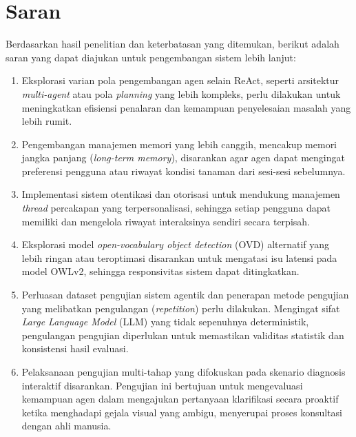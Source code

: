 \section{Saran}
Berdasarkan hasil penelitian dan keterbatasan yang ditemukan, berikut adalah saran yang dapat diajukan untuk pengembangan sistem lebih lanjut:

\begin{enumerate}[nosep]
    \item Eksplorasi varian pola pengembangan agen selain ReAct, seperti arsitektur \textit{multi-agent} atau pola \textit{planning} yang lebih kompleks, perlu dilakukan untuk meningkatkan efisiensi penalaran dan kemampuan penyelesaian masalah yang lebih rumit.
    \item Pengembangan manajemen memori yang lebih canggih, mencakup memori jangka panjang (\textit{long-term memory}), disarankan agar agen dapat mengingat preferensi pengguna atau riwayat kondisi tanaman dari sesi-sesi sebelumnya.
    \item Implementasi sistem otentikasi dan otorisasi untuk mendukung manajemen \textit{thread} percakapan yang terpersonalisasi, sehingga setiap pengguna dapat memiliki dan mengelola riwayat interaksinya sendiri secara terpisah.
    \item Eksplorasi model \textit{open-vocabulary object detection} (OVD) alternatif yang lebih ringan atau teroptimasi disarankan untuk mengatasi isu latensi pada model OWLv2, sehingga responsivitas sistem dapat ditingkatkan.
    \item Perluasan dataset pengujian sistem agentik dan penerapan metode pengujian yang melibatkan pengulangan (\textit{repetition}) perlu dilakukan. Mengingat sifat \textit{Large Language Model} (LLM) yang tidak sepenuhnya deterministik, pengulangan pengujian diperlukan untuk memastikan validitas statistik dan konsistensi hasil evaluasi.
    \item Pelaksanaan pengujian multi-tahap yang difokuskan pada skenario diagnosis interaktif disarankan. Pengujian ini bertujuan untuk mengevaluasi kemampuan agen dalam mengajukan pertanyaan klarifikasi secara proaktif ketika menghadapi gejala visual yang ambigu, menyerupai proses konsultasi dengan ahli manusia.
\end{enumerate}
